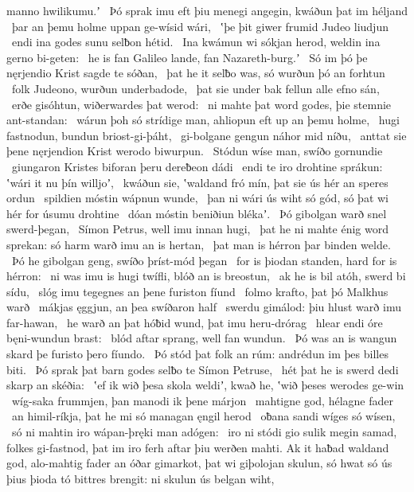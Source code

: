 manno hwilikumu.ʼ \hld\ Þó sprak imu eft þiu menegi angegin,
kwáðun þat im héljand \hld\ þar an þemu holme uppan
ge-wísid wári, \hld\ ʽþe þit giwer frumid
Judeo liudjun \hld\ endi ina godes sunu
selƀon hétid. \hld\ Ina kwámun wi sókjan herod,
weldin ina gerno bi-geten: \hld\ he is fan Galileo lande,
fan Nazareth-burg.ʼ \hld\ Só im þó þe nęrjendio Krist
sagde te sóðan, \hld\ þat he it selƀo was,
só wurðun þó an forhtun \hld\ folk Judeono,
wurðun underbadode, \hld\ þat sie under bak fellun
alle efno sán, \hld\ erðe gisóhtun,
wiðerwardes þat werod: \hld\ ni mahte þat word godes,
þie stemnie ant-standan: \hld\ wárun þoh só strídige man,
ahliopun eft up an þemu holme, \hld\ hugi fastnodun,
bundun briost-gi-þáht, \hld\ gi-bolgane gengun
náhor mid níðu, \hld\ anttat sie þene nęrjendion Krist
werodo biwurpun. \hld\ Stódun wíse man,
swíðo gornundie \hld\ giungaron Kristes
biforan þeru dereƀeon dádi \hld\ endi te iro drohtine sprákun:
ʽwári it nu þín willjoʼ, \hld\ kwáðun sie, ʽwaldand fró mín,
þat sie ús hér an speres ordun \hld\ spildien móstin
wápnun wunde, \hld\ þan ni wári ús wiht só gód,
só þat wi hér for úsumu drohtine \hld\ dóan móstin
beniðiun blékaʼ. \hld\ Þó gibolgan warð
snel swerd-þegan, \hld\ Símon Petrus,
well imu innan hugi, \hld\ þat he ni mahte énig word sprekan:
só harm warð imu an is hertan, \hld\ þat man is hérron þar
binden welde. \hld\ Þó he gibolgan geng,
swíðo þríst-mód þegan \hld\ for is þiodan standen,
hard for is hérron: \hld\ ni was imu is hugi twífli,
blóð an is breostun, \hld\ ak he is bil atóh,
swerd bi sídu, \hld\ slóg imu tegegnes
an þene furiston fíund \hld\ folmo krafto,
þat þó Malkhus warð \hld\ mákjas ęggjun,
an þea swíðaron half \hld\ swerdu gimálod:
þiu hlust warð imu far-hawan, \hld\ he warð an þat hóƀid wund,
þat imu heru-drórag \hld\ hlear endi óre
bęni-wundun brast: \hld\ blód aftar sprang,
well fan wundun. \hld\ Þó was an is wangun skard
þe furisto þero fíundo. \hld\ Þó stód þat folk an rúm:
andrédun im þes billes biti. \hld\ Þó sprak þat barn godes
selƀo te Símon Petruse, \hld\ hét þat he is swerd dedi
skarp an skéðia: \hld\ ʽef ik wið þesa skola weldiʼ, kwað he,
ʽwið þeses werodes ge-win \hld\ wíg-saka frummjen,
þan manodi ik þene márjon \hld\ mahtigne god,
hélagne fader \hld\ an himil-ríkja,
þat he mi só managan ęngil herod \hld\ oƀana sandi
wíges só wísen, \hld\ só ni mahtin iro wápan-þręki
man adógen: \hld\ iro ni stódi gio sulik megin samad,
folkes gi-fastnod, þat im iro ferh aftar þiu
werðen mahti. Ak it haƀad waldand god,
alo-mahtig fader an óðar gimarkot,
þat wi giþolojan skulun, só hwat só ús þius þioda tó
bittres brengit: ni skulun ús belgan wiht,
